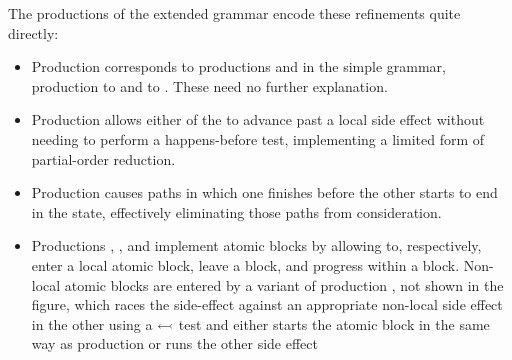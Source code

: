 The productions of the extended grammar encode these refinements quite
directly:
\begin{itemize}
\item Production  corresponds to productions
   and  in the simple grammar,
  production  to  and  to
  .  These need no further explanation.
\item Production  allows either of the {\StateMachines}
  to advance past a local side effect without needing to perform a
  happens-before test, implementing a limited form of partial-order
  reduction.
\item Production  causes paths in which one
  {\StateMachine} finishes before the other starts to end in the
  {\stUnreached} state, effectively eliminating those paths from
  consideration.
\item Productions , , and
   implement atomic blocks by allowing {\StateMachines}
  to, respectively, enter a local atomic block, leave a block, and
  progress within a block.  Non-local atomic blocks are entered by a
  variant of production , not shown in the figure,
  which races the {\stStartAtomic} side-effect against an appropriate
  non-local side effect in the other {\StateMachine} using a
  $\leftarrowtail$ test and either starts the atomic block in the
  same way as production  or runs the other side
  effect
\end{itemize}
